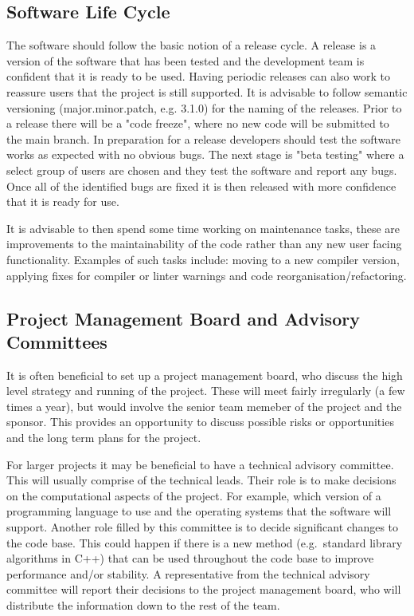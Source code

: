 \documentclass[jnr]{iosart2x}
\begin{document}
\subsection{Software Life Cycle}\label{lc}
The software should follow the basic notion of a release cycle.
A release is a version of the software that has been tested and the development team is confident that it is ready to be used.
Having periodic releases can also work to reassure users that the project is still supported.
It is advisable to follow semantic versioning \cite{Semantic_Versioning} (major.minor.patch, e.g. 3.1.0) for the naming of the releases.
Prior to a release there will be a "code freeze", where no new code will be submitted to the main branch.
In preparation for a release developers should test the software works as expected with no obvious bugs.
The next stage is "beta testing" where a select group of users are chosen and they test the software and report any bugs.
Once all of the identified bugs are fixed it is then released with more confidence that it is ready for use.

It is advisable to then spend some time working on maintenance tasks, these are improvements to the maintainability of the code rather than any new user facing functionality.
Examples of such tasks include: moving to a new compiler version, applying fixes for compiler or linter warnings and code reorganisation/refactoring.

\subsection{Project Management Board and Advisory Committees}\label{PM big}

It is often beneficial to set up a project management board, who discuss the high level strategy and running of the project.
These will meet fairly irregularly (a few times a year), but would involve the senior team memeber of the project and the sponsor.
This provides an opportunity to discuss possible risks or opportunities and the long term plans for the project.

For larger projects it may be beneficial to have a technical advisory committee.
This will usually comprise of the technical leads.
Their role is to make decisions on the computational aspects of the project.
For example, which version of a programming language to use and the operating systems that the software will support.
Another role filled by this committee is to decide significant changes to the code base.
This could happen if there is a new method (e.g.\ standard library algorithms in C++) that can be used throughout the code base to improve performance and/or stability.
A representative from the technical advisory committee will report their decisions to the project management board, who will distribute the information down to the rest of the team.
\end{document}
